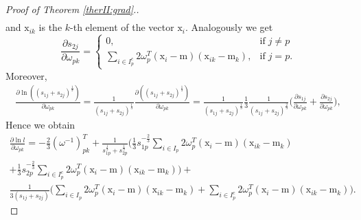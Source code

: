 \documentclass[12pt]{article}
\def\w{\omega}
\def\x{\mathrm{x}}
\def\m{\mathrm{m}}
\theoremstyle{definition}
\begin{document}
\begin{proof}[Proof of Theorem \ref{therII:grad}.]
$$\begin{array}{l}
\end{array}
$$
and $\x_{ik}$ is the $k$-th element of the vector $\x_i$. Analogously we get
$$\frac{\partial {s}_{2j}}{\partial \w_{pk}} = \left\{ \begin{array}{ll}
0, & \text{if} \; j\neq p\\
\sum\limits_{ i \in {I}_p^c} 2 \w^T_p (\x_i - \m) (\x_{ik} - \m_k), & \text{if} \; j=p.
\end{array} \right.
$$
Moreover,
$$
\begin{array}{l}
\frac{\partial \ln ( (s_{1j}+s_{2j})^{\frac{1}{3}} )}{\partial \w_{pk}} = \frac{1}{ (s_{1j}+s_{2j})^{\frac{1}{3}} } \frac{\partial ( (s_{1j}+s_{2j})^{\frac{1}{3}} )}{\partial \w_{pk}}= \frac{1}{ (s_{1j}+s_{2j})^{\frac{1}{3}} } \frac{1}{3} \frac{1}{ (s_{1j}+s_{2j})^{\frac{2}{3}} } \bigg(
  \frac{\partial {s}_{1j}}{\partial \w_{pk}} +
  \frac{\partial {s}_{2j}}{\partial \w_{pk}}
\bigg),
\end{array}
$$
Hence we obtain %
$$
\begin{array}{l}
\frac{\partial \ln {l}}{\partial \w_{pk}} = -\frac{2}{3} (\w^{-1})^T_{pk} + \frac{1}{{s}_{1p}^{\frac{1}{3}} +{s}_{2p}^{\frac{1}{3}}} 
 \bigg(
\frac{1}{3} {s}_{1p}^{-\frac{2}{3}} \sum\limits_{ i \in {I}_p} 2 \w^T_p (\x_i - \m) (\x_{ik} - \m_k)\\[6pt]
+ \frac{1}{3} {s}_{2p}^{-\frac{2}{3}} \sum\limits_{ i \in {I}_p^c} 2 \w^T_p (\x_i - \m) (\x_{ik} - \m_k) \bigg)+\\[6pt]

\frac{1}{ 3(s_{1j}+s_{2j}) } 
 \bigg(
\sum\limits_{ i \in {I}_p} 2 \w^T_p (\x_i - \m) (\x_{ik} - \m_k) + \sum\limits_{ i \in {I}_p^c} 2 \w^T_p (\x_i - \m) (\x_{ik} - \m_k) \bigg)
.
\end{array}
$$

\end{proof}



\end{document}
